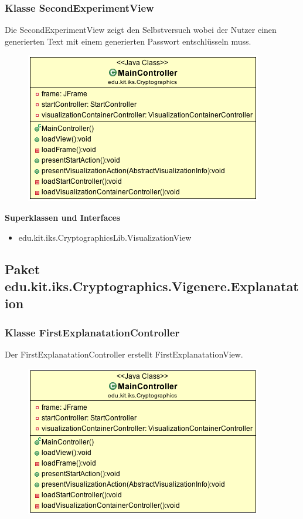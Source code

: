 \documentclass{article}
\begin{document}
    \subsubsection{Klasse SecondExperimentView}
      Die SecondExperimentView zeigt den Selbstversuch wobei der Nutzer einen generierten Text mit einem generierten Passwort entschlüsseln muss.
      \begin{figure}[H]
        \centering
        \includegraphics[width=\textwidth]{resources/edu-kit-iks-Cryptographics-MainController}
      \end{figure}

      \textbf{Superklassen und Interfaces}
      \begin{itemize}
        \item edu.kit.iks.CryptographicsLib.VisualizationView
      \end{itemize}

  \subsection{Paket edu.kit.iks.Cryptographics.Vigenere.Explanatation}
    \subsubsection{Klasse FirstExplanatationController}
      Der FirstExplanatationController erstellt FirstExplanatationView.
      \begin{figure}[H]
        \centering
        \includegraphics[width=\textwidth]{resources/edu-kit-iks-Cryptographics-MainController}
      \end{figure}
\end{document}
